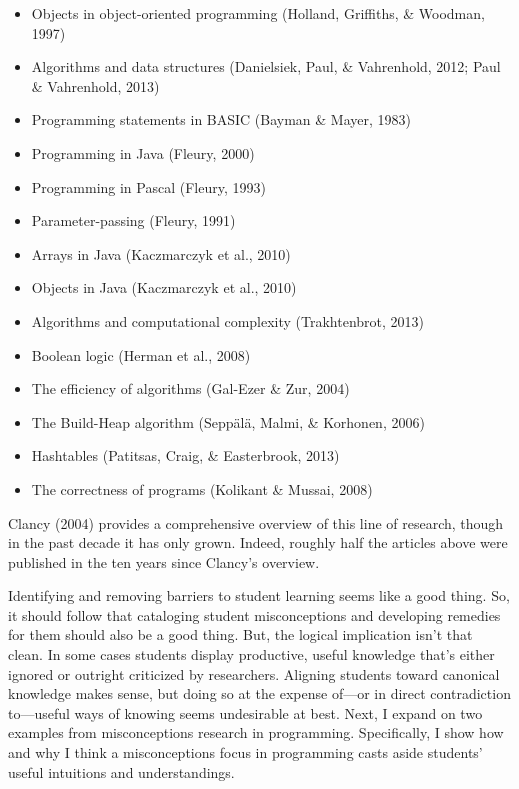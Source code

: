 \begin{itemize}
\tightlist
\item
  Objects in object-oriented programming (Holland, Griffiths, \&
  Woodman, 1997)
\item
  Algorithms and data structures (Danielsiek, Paul, \& Vahrenhold, 2012;
  Paul \& Vahrenhold, 2013)
\item
  Programming statements in BASIC (Bayman \& Mayer, 1983)
\item
  Programming in Java (Fleury, 2000)
\item
  Programming in Pascal (Fleury, 1993)
\item
  Parameter-passing (Fleury, 1991)
\item
  Arrays in Java (Kaczmarczyk et al., 2010)
\item
  Objects in Java (Kaczmarczyk et al., 2010)
\item
  Algorithms and computational complexity (Trakhtenbrot, 2013)
\item
  Boolean logic (Herman et al., 2008)
\item
  The efficiency of algorithms (Gal-Ezer \& Zur, 2004)
\item
  The Build-Heap algorithm (Seppälä, Malmi, \& Korhonen, 2006)
\item
  Hashtables (Patitsas, Craig, \& Easterbrook, 2013)
\item
  The correctness of programs (Kolikant \& Mussai, 2008)
\end{itemize}

Clancy (2004) provides a comprehensive overview of this line of
research, though in the past decade it has only grown. Indeed, roughly
half the articles above were published in the ten years since Clancy's
overview.

Identifying and removing barriers to student learning seems like a good
thing. So, it should follow that cataloging student misconceptions and
developing remedies for them should also be a good thing. But, the
logical implication isn't that clean. In some cases students display
productive, useful knowledge that's either ignored or outright
criticized by researchers. Aligning students toward canonical knowledge
makes sense, but doing so at the expense of---or in direct contradiction
to---useful ways of knowing seems undesirable at best. Next, I expand on
two examples from misconceptions research in programming. Specifically,
I show how and why I think a misconceptions focus in programming casts
aside students' useful intuitions and understandings.

